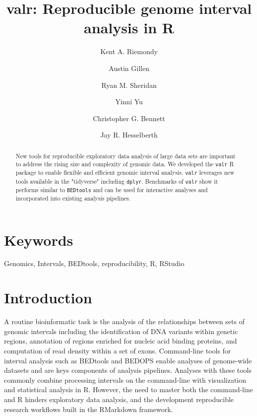 \documentclass[9pt,a4paper]{extarticle}
\begin{document}
\pagestyle{front}

\title{valr: Reproducible genome interval analysis in R}
\author[1]{Kent A. Riemondy}
\author[1]{Austin Gillen}
\author[2]{Ryan M. Sheridan}
\author[2]{Yinni Yu}
\author[3]{Christopher G. Bennett}
\author[1,2,*]{Jay R. Hesselberth}


\maketitle
\thispagestyle{front}

\begin{abstract}
New tools for reproducible exploratory data analysis of large data sets are important to address the rising size and complexity of genomic data. We developed the \texttt{valr} R package to enable flexible and efficient genomic interval analysis. \texttt{valr} leverages new tools available in the "tidyverse" including \texttt{dplyr}. Benchmarks of \texttt{valr} show it performs similar to \texttt{BEDtools} and can be used for interactive  analyses and incorporated into existing analysis pipelines.

\end{abstract}

\section*{Keywords}

Genomics, Intervals, BEDtools, reproducibility, R, RStudio

\clearpage
\pagestyle{main}
\section*{Introduction}

	A routine bioinformatic task is the analysis of the relationships between sets of genomic intervals including the identification of DNA variants within genetic regions, annotation of regions enriched for nucleic acid binding proteins, and computation of read density within a set of exons. Command-line tools for interval analysis such as BEDtools \cite{quinlan_bedtools:_2010} and BEDOPS \cite{neph_bedops:_2012} enable analyses of genome-wide datasets and are keys components of analysis pipelines. Analyses with these tools commonly combine processing intervals on the command-line with visualization and statistical analysis in R. However, the need to master both the command-line and R hinders exploratory data analysis, and the development reproducible research workflows built in the RMarkdown framework.
\end{document}
